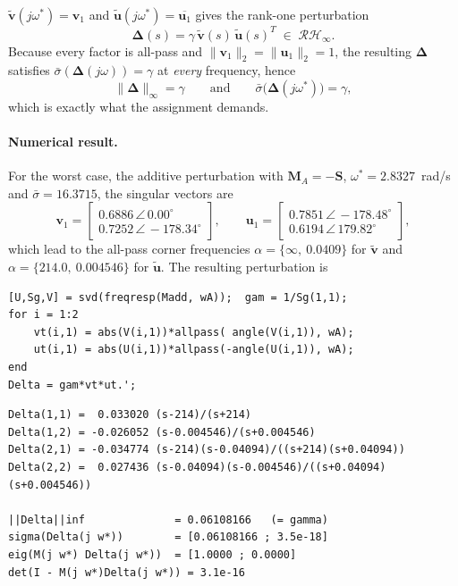 $\tilde{\mathbf{v}}(j\omega^*)=\mathbf{v}_1$ and
$\tilde{\mathbf{u}}(j\omega^*)=\overline{\mathbf{u}_1}$ gives the rank-one perturbation
\begin{equation}
    \boldsymbol{\Delta}(s) = \gamma\,\tilde{\mathbf{v}}(s)\,\tilde{\mathbf{u}}(s)^T
    \;\in\;\mathcal{RH}_\infty .
    \label{eq:deltaconstruction}
\end{equation}
Because every factor is all-pass and $\|\mathbf{v}_1\|_2=\|\mathbf{u}_1\|_2=1$, the resulting
$\boldsymbol{\Delta}$ satisfies $\bar{\sigma}(\boldsymbol{\Delta}(j\omega))=\gamma$ at
\emph{every} frequency, hence
\begin{equation}
    \|\boldsymbol{\Delta}\|_\infty = \gamma
    \qquad\text{and}\qquad
    \bar{\sigma}\big(\boldsymbol{\Delta}(j\omega^*)\big) = \gamma ,
    \label{eq:deltaproperties}
\end{equation}
which is exactly what the assignment demands.

\paragraph{Numerical result.} For the worst case, the additive perturbation with
$\mathbf{M}_A=-\mathbf{S}$, $\omega^*=2.8327$~rad/s and $\bar{\sigma}=16.3715$, the singular
vectors are
\begin{equation}
    \mathbf{v}_1 = \begin{bmatrix}0.6886\,\angle\,0.00^\circ\\
                                  0.7252\,\angle\,{-}178.34^\circ\end{bmatrix},
    \qquad
    \mathbf{u}_1 = \begin{bmatrix}0.7851\,\angle\,{-}178.48^\circ\\
                                  0.6194\,\angle\,179.82^\circ\end{bmatrix},
    \label{eq:svectors}
\end{equation}
which lead to the all-pass corner frequencies $\alpha=\{\infty,\ 0.0409\}$ for
$\tilde{\mathbf{v}}$ and $\alpha=\{214.0,\ 0.004546\}$ for $\tilde{\mathbf{u}}$. The resulting
perturbation is

\begin{lstlisting}
[U,Sg,V] = svd(freqresp(Madd, wA));  gam = 1/Sg(1,1);
for i = 1:2
    vt(i,1) = abs(V(i,1))*allpass( angle(V(i,1)), wA);
    ut(i,1) = abs(U(i,1))*allpass(-angle(U(i,1)), wA);
end
Delta = gam*vt*ut.';
\end{lstlisting}
\begin{lstlisting}[style=matlabout]
Delta(1,1) =  0.033020 (s-214)/(s+214)
Delta(1,2) = -0.026052 (s-0.004546)/(s+0.004546)
Delta(2,1) = -0.034774 (s-214)(s-0.04094)/((s+214)(s+0.04094))
Delta(2,2) =  0.027436 (s-0.04094)(s-0.004546)/((s+0.04094)(s+0.004546))

||Delta||inf              = 0.06108166   (= gamma)
sigma(Delta(j w*))        = [0.06108166 ; 3.5e-18]
eig(M(j w*) Delta(j w*))  = [1.0000 ; 0.0000]
det(I - M(j w*)Delta(j w*)) = 3.1e-16
\end{lstlisting}

